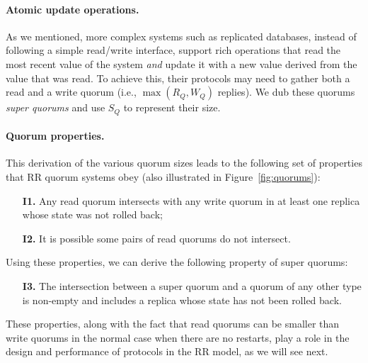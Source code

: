 \paragraph{Atomic update operations.}
As we mentioned, more complex systems such as replicated
databases, instead of following a simple read/write interface,
support rich operations that read the most recent value of the
system \emph{and} update it with a new value derived from the
value that was read. To achieve this, their protocols may need to
gather both a read and a write quorum (i.e., $\max(R_Q, W_Q)$
replies). We dub these quorums \emph{super quorums} and use $S_Q$
to represent their size.

\paragraph{Quorum properties.} This derivation of the various quorum
sizes leads to the following set of properties that \ac{RR} quorum
systems obey (also illustrated in Figure~\ref{fig:quorums}):

\begin{enumerate}
    \item[\textbf{I1.}] Any read quorum intersects with any write
        quorum in at least one replica whose state was not rolled
        back;
    \item[\textbf{I2.}] It is possible some pairs of read quorums
        do not intersect.
\end{enumerate}

Using these properties, we can derive the following
property of super quorums:

\begin{enumerate}
    \item[\textbf{I3.}] The intersection between a super quorum
        and a quorum of any other type is non-empty and includes
        a replica whose state has not been rolled back.
\end{enumerate}

These properties, along with the fact that read quorums can be
smaller than write quorums in the normal case when there
are no restarts, play a role in the design and performance of
protocols in the \ac{RR} model, as we will see next.

